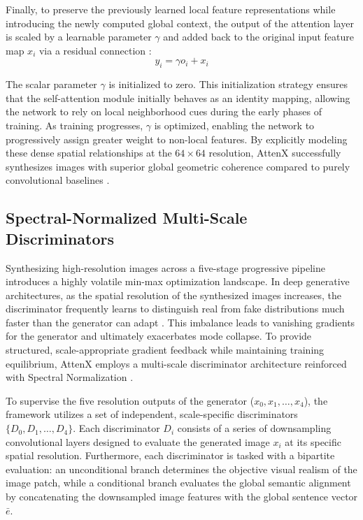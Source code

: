\documentclass[conference]{IEEEtran}
\begin{document}
Finally, to preserve the previously learned local feature representations while introducing the newly computed global context, the output of the attention layer is scaled by a learnable parameter $\gamma$ and added back to the original input feature map $x_i$ via a residual connection \cite{he2016deep}:
\begin{equation}
    y_i = \gamma o_i + x_i
\end{equation}

The scalar parameter $\gamma$ is initialized to zero. This initialization strategy ensures that the self-attention module initially behaves as an identity mapping, allowing the network to rely on local neighborhood cues during the early phases of training. As training progresses, $\gamma$ is optimized, enabling the network to progressively assign greater weight to non-local features. By explicitly modeling these dense spatial relationships at the $64 \times 64$ resolution, AttenX successfully synthesizes images with superior global geometric coherence compared to purely convolutional baselines \cite{zhang2019selfattention}.

\subsection{Spectral-Normalized Multi-Scale Discriminators}

Synthesizing high-resolution images across a five-stage progressive pipeline introduces a highly volatile min-max optimization landscape. In deep generative architectures, as the spatial resolution of the synthesized images increases, the discriminator frequently learns to distinguish real from fake distributions much faster than the generator can adapt \cite{arjovsky2017wasserstein}. This imbalance leads to vanishing gradients for the generator and ultimately exacerbates mode collapse. To provide structured, scale-appropriate gradient feedback while maintaining training equilibrium, AttenX employs a multi-scale discriminator architecture reinforced with Spectral Normalization \cite{miyato2018spectral}.

To supervise the five resolution outputs of the generator ($x_0, x_1, \dots, x_4$), the framework utilizes a set of independent, scale-specific discriminators $\{D_0, D_1, \dots, D_4\}$. Each discriminator $D_i$ consists of a series of downsampling convolutional layers designed to evaluate the generated image $x_i$ at its specific spatial resolution. Furthermore, each discriminator is tasked with a bipartite evaluation: an unconditional branch determines the objective visual realism of the image patch, while a conditional branch evaluates the global semantic alignment by concatenating the downsampled image features with the global sentence vector $\bar{e}$.
\end{document}
